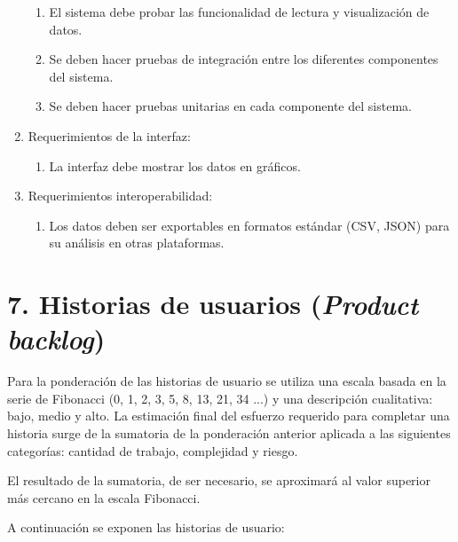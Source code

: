 \documentclass[
11pt, %
codirector, %
]{charter}
\begin{document}
\begin{enumerate}
\begin{enumerate}
			\item El sistema debe probar las funcionalidad de lectura y visualización de datos.
			\item Se deben hacer pruebas de integración entre los diferentes componentes del sistema. 
			\item Se deben hacer pruebas unitarias en cada componente del sistema.
		\end{enumerate}
	\item Requerimientos de la interfaz:
		\begin{enumerate}
			\item La interfaz debe mostrar los datos en gráficos.
		\end{enumerate}
	\item Requerimientos interoperabilidad:
		\begin{enumerate}
			\item Los datos deben ser exportables en formatos estándar (CSV, JSON) para su análisis en otras plataformas.
		\end{enumerate}
\end{enumerate}

\section{7. Historias de usuarios (\textit{Product backlog})}
\label{sec:backlog}

Para la ponderación de las historias de usuario se utiliza una escala basada en la serie de
Fibonacci (0, 1, 2, 3, 5, 8, 13, 21, 34 ...) y una descripción cualitativa: bajo, medio y alto.
La estimación final del esfuerzo requerido para completar una historia surge de la sumatoria de
la ponderación anterior aplicada a las siguientes categorías: cantidad de trabajo, complejidad
y riesgo. 

El resultado de la sumatoria, de ser necesario, se aproximará al valor superior más
cercano en la escala Fibonacci.

A continuación se exponen las historias de usuario:
\end{document}
